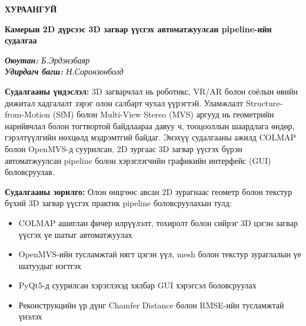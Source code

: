 \renewcommand{\headrulewidth}{0pt}

\begin{center}
{\Large\bfseries ХУРААНГУЙ}
\end{center}

\vspace{0.5cm}

\begin{center}
{\fontsize{14pt}{16pt}\selectfont \textbf{Камерын 2D дүрсээс 3D загвар үүсгэх автоматжуулсан pipeline-ийн судалгаа}}
\end{center}

\begin{flushright}
\itshape
\textbf{Оюутан:} Б.Эрдэнэбаяр\\
\textbf{Удирдагч багш:} Н.Соронзонболд
\end{flushright}

\vspace{0.5cm}

\noindent\textbf{Судалгааны үндэслэл:}
3D загварчлал нь роботикс, VR/AR болон соёлын өвийн дижитал хадгалалт зэрэг олон салбарт чухал үүрэгтэй. Уламжлалт Structure-from-Motion (SfM) болон Multi-View Stereo (MVS) аргууд нь геометрийн нарийвчлал болон тогтвортой байдлаараа давуу ч, тооцооллын шаардлага өндөр, гэрэлтүүлгийн нөхцөлд мэдрэмтгий байдаг. Энэхүү судалгааны ажилд COLMAP болон OpenMVS-д суурилсан, 2D зургаас 3D загвар үүсгэх бүрэн автоматжуулсан pipeline болон хэрэглэгчийн графикийн интерфейс (GUI) боловсруулав.

\vspace{0.3cm}

\noindent\textbf{Судалгааны зорилго:}
Олон өнцгөөс авсан 2D зурагнаас геометр болон текстур бүхий 3D загвар үүсгэх практик pipeline боловсруулахын тулд:
\begin{itemize}
\item COLMAP ашиглан фичер илрүүлэлт, тохиролт болон сийрэг 3D цэгэн загвар үүсгэх үе шатыг автоматжуулах
\item OpenMVS-ийн тусламжтай нягт цэгэн үүл, mesh болон текстур зураглалын үе шатуудыг нэгтгэх
\item PyQt5-д суурилсан хэрэглэхэд хялбар GUI хэрэгсэл боловсруулах
\item Реконструкцийн үр дүнг Chamfer Distance болон RMSE-ийн тусламжтай үнэлэх
\end{itemize}

\vspace{0.3cm}

